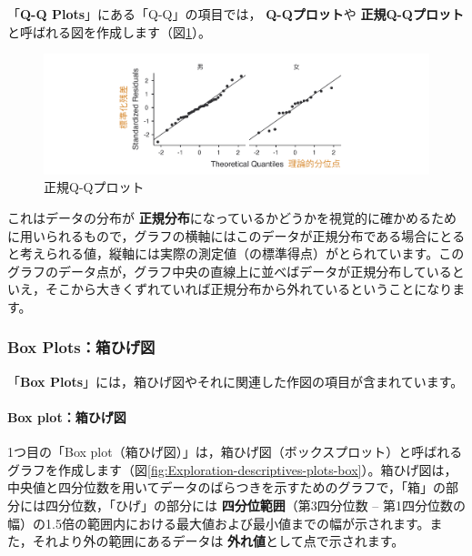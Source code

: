 \documentclass[
  12pt,
  a5jpaper,
  lualatex, ja=standard]{bxjsbook}
\renewcommand{\emph}[1]{\textbf{\color{emph} #1}}
\begin{document}
「\textbf{Q-Q Plots}」にある「Q-Q」の項目では，\emph{Q-Qプロット}や\emph{正規Q-Qプロット}と呼ばれる図を作成します（図\ref{fig:Exploration-descriptives-plots-qq}）。

\begin{figure}[!ht]

{\centering \includegraphics[width=1\linewidth]{images/exploration/Exploration-descriptives-plots-qq} 

}

\caption{正規Q-Qプロット}\label{fig:Exploration-descriptives-plots-qq}
\end{figure}

これはデータの分布が\emph{正規分布}になっているかどうかを視覚的に確かめるために用いられるもので，グラフの横軸にはこのデータが正規分布である場合にとると考えられる値，縦軸には実際の測定値（の標準得点）がとられています。このグラフのデータ点が，グラフ中央の直線上に並べばデータが正規分布しているといえ，そこから大きくずれていれば正規分布から外れているということになります。

\hypertarget{subsubsub:exp-plots-box}{%
\subsubsection*{Box Plots：箱ひげ図}\label{subsubsub:exp-plots-box}}

「\textbf{Box Plots}」には，箱ひげ図やそれに関連した作図の項目が含まれています。

\hypertarget{box-plotux7bb1ux3072ux3052ux56f3}{%
\paragraph*{Box plot：箱ひげ図}\label{box-plotux7bb1ux3072ux3052ux56f3}}

1つ目の「Box plot（箱ひげ図）」は，箱ひげ図（ボックスプロット）と呼ばれるグラフを作成します（図\ref{fig:Exploration-descriptives-plots-box}）。箱ひげ図は，中央値と四分位数を用いてデータのばらつきを示すためのグラフで，「箱」の部分には四分位数，「ひげ」の部分には\emph{四分位範囲}（第3四分位数 -- 第1四分位数の幅）の1.5倍の範囲内における最大値および最小値までの幅が示されます。また，それより外の範囲にあるデータは\emph{外れ値}として点で示されます。
\end{document}
